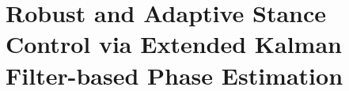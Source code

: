 \chapter{Robust and Adaptive Stance Control via Extended Kalman Filter-based
Phase Estimation}\label{sec:phase_estimation}

\graphicspath{{chapters/phase_estimation/figures/}}






